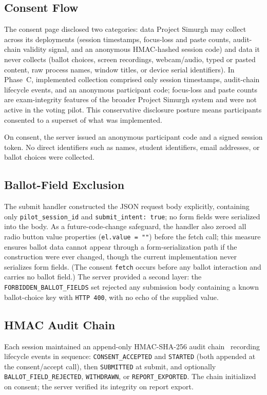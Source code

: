 \documentclass[conference]{IEEEtran}
\newcommand{\sys}{Project Simurgh}
\begin{document}
\subsection{Consent Flow}

The consent page disclosed two categories: data \sys{} may collect across its
deployments (session timestamps, focus-loss and paste counts, audit-chain
validity signal, and an anonymous HMAC-hashed session code) and data it never
collects (ballot choices, screen recordings, webcam/audio, typed or pasted
content, raw process names, window titles, or device serial identifiers).
In Phase~C, implemented collection comprised only session timestamps,
audit-chain lifecycle events, and an anonymous participant code; focus-loss and
paste counts are exam-integrity features of the broader \sys{} system and were
not active in the voting pilot. This conservative disclosure posture means
participants consented to a superset of what was implemented.

On consent, the server issued an anonymous participant code and a signed session
token. No direct identifiers such as names, student identifiers, email
addresses, or ballot choices were collected.

\subsection{Ballot-Field Exclusion}

The submit handler constructed the JSON request body explicitly, containing only
\texttt{pilot\_session\_id} and \texttt{submit\_intent: true}; no form fields
were serialized into the body. As a future-code-change safeguard, the handler
also zeroed all radio button value properties (\texttt{el.value = ""}) before
the fetch call; this measure ensures ballot data cannot appear through a
form-serialization path if the construction were ever changed, though the
current implementation never serializes form fields. (The consent
\texttt{fetch} occurs before any ballot interaction and carries no ballot
field.) The server provided a second layer:
the \texttt{FORBIDDEN\_BALLOT\_FIELDS} set rejected any submission body
containing a known ballot-choice key with \texttt{HTTP~400}, with no echo of
the supplied value.

\subsection{HMAC Audit Chain}

Each session maintained an append-only HMAC-SHA-256 audit
chain~\cite{rfc2104} recording lifecycle events in sequence:
\texttt{CONSENT\_ACCEPTED} and \texttt{STARTED} (both appended at the
consent/accept call), then \texttt{SUBMITTED} at submit, and optionally
\texttt{BALLOT\_FIELD\_REJECTED}, \texttt{WITHDRAWN}, or
\texttt{REPORT\_EXPORTED}. The chain initialized on consent; the server
verified its integrity on report export.
\end{document}
